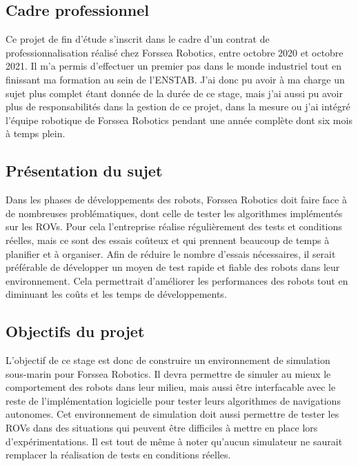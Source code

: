 \subsection{Cadre professionnel}
    Ce projet de fin d'étude s'inscrit dans le cadre d'un contrat de professionnalisation réalisé chez Forssea Robotics, entre octobre 2020 et octobre 2021. Il m'a permis d'effectuer un premier pas dans le monde industriel tout en finissant ma formation au sein de l'\gls{ENSTAB}. J'ai donc pu avoir à ma charge un sujet plus complet étant donnée de la durée de ce stage, mais j'ai aussi pu avoir plus de responsabilités dans la gestion de ce projet, dans la mesure ou j'ai intégré l'équipe robotique de Forssea Robotics pendant une année complète dont six mois à temps plein.

\subsection{Présentation du sujet}
    Dans les phases de développements des robots, Forssea Robotics doit faire face à de nombreuses problématiques, dont celle de tester les algorithmes implémentés sur les \gls{ROV}s. Pour cela l'entreprise réalise régulièrement des tests et conditions réelles, mais ce sont des essais coûteux et qui prennent beaucoup de temps à planifier et à organiser. Afin de réduire le nombre d'essais nécessaires, il serait préférable de développer un moyen de test rapide et fiable des robots dans leur environnement. Cela permettrait d'améliorer les performances des robots tout en diminuant les coûts et les temps de développements.

\subsection{Objectifs du projet}
    L'objectif de ce stage est donc de construire un environnement de simulation sous-marin pour Forssea Robotics. Il devra permettre de simuler au mieux le comportement des robots dans leur milieu, mais aussi être interfacable avec le reste de l'implémentation logicielle pour tester leurs algorithmes de navigations autonomes. Cet environnement de simulation doit aussi permettre de tester les \gls{ROV}s dans des situations qui peuvent être difficiles à mettre en place lors d'expérimentations. Il est tout de même à noter qu'aucun simulateur ne saurait remplacer la réalisation de tests en conditions réelles.
